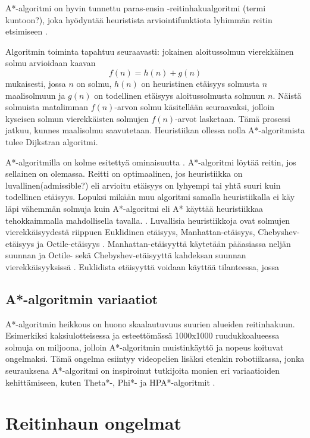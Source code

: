 \documentclass[utf8]{gradu3}
\begin{document}
A*-algoritmi on hyvin tunnettu paras-ensin -reitinhakualgoritmi (termi kuntoon?), joka hyödyntää heuristista arviointifunktiota lyhimmän reitin etsimiseen \parencite{cui2011based,duchovn2014path}.

Algoritmin toiminta tapahtuu seuraavasti: jokainen aloitussolmun vierekkäinen solmu arvioidaan kaavan \[f(n)=h(n)+g(n)\] mukaisesti, jossa \(n\) on solmu, \(h(n)\) on heuristinen etäisyys solmusta \(n\) maalisolmuun ja \(g(n)\) on todellinen etäisyys aloitussolmusta solmuun \(n\). Näistä solmuista matalimman \(f(n)\)-arvon solmu käsitellään seuraavaksi, jolloin kyseisen solmun vierekkäisten solmujen \(f(n)\)-arvot lasketaan. Tämä prosessi jatkuu, kunnes maalisolmu saavutetaan. Heuristiikan ollessa nolla A*-algoritmista tulee Dijkstran algoritmi.

A*-algoritmilla on kolme esitettyä ominaisuutta \parencite{hart1968formal}. A*-algoritmi löytää reitin, jos sellainen on olemassa. Reitti on optimaalinen, jos heuristiikka on luvallinen(admissible?) eli arvioitu etäisyys on lyhyempi tai yhtä suuri kuin todellinen etäisyys. Lopuksi mikään muu algoritmi samalla heuristiikalla ei käy läpi vähemmän solmuja kuin A*-algoritmi eli A* käyttää heuristiikkaa tehokkaimmalla mahdollisella tavalla. \parencite{hart1968formal,cui2011based}. Luvallisia heuristiikkoja ovat solmujen vierekkäisyydestä riippuen Euklidinen etäisyys, Manhattan-etäisyys, Chebyshev-etäisyys ja Octile-etäisyys \parencite{duchovn2014path,botea2013pathfinding}. Manhattan-etäisyyttä käytetään pääasiassa neljän suunnan ja Octile- sekä Chebyshev-etäisyyttä kahdeksan suunnan vierekkäisyyksissä \parencite{botea2013pathfinding}. Euklidista etäisyyttä voidaan käyttää tilanteessa, jossa 

\subsection{A*-algoritmin variaatiot}

A*-algoritmin heikkous on huono skaalautuvuus suurien alueiden reitinhakuun. Esimerkiksi kaksiulotteisessa ja esteettömässä 1000x1000 ruudukkoalueessa solmuja on miljoona, jolloin A*-algoritmin muistinkäyttö ja nopeus koituvat ongelmaksi. \parencite{cui2011based,duchovn2014path} Tämä ongelma esiintyy videopelien lisäksi etenkin robotiikassa, jonka seurauksena A*-algoritmi on inspiroinut tutkijoita monien eri variaatioiden kehittämiseen, kuten Theta*-, Phi*- ja HPA*-algoritmit \parencite{duchovn2014path}.

\section{Reitinhaun ongelmat}
\end{document}
